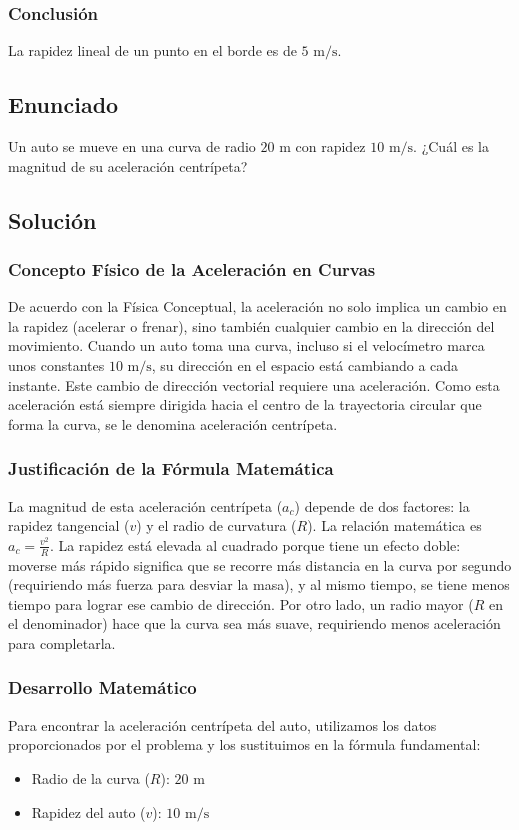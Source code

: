 \documentclass{article}
\begin{document}
\subsubsection*{Conclusión}
La rapidez lineal de un punto en el borde es de $5 \text{ m/s}$.

\newpage

\subsection*{Enunciado}
Un auto se mueve en una curva de radio $20 \text{ m}$ con rapidez $10 \text{ m/s}$. ¿Cuál es la magnitud de su aceleración centrípeta?

\subsection*{Solución}

\subsubsection*{Concepto Físico de la Aceleración en Curvas}
De acuerdo con la Física Conceptual, la aceleración no solo implica un cambio en la rapidez (acelerar o frenar), sino también cualquier cambio en la dirección del movimiento. Cuando un auto toma una curva, incluso si el velocímetro marca unos constantes $10 \text{ m/s}$, su dirección en el espacio está cambiando a cada instante. Este cambio de dirección vectorial requiere una aceleración. Como esta aceleración está siempre dirigida hacia el centro de la trayectoria circular que forma la curva, se le denomina aceleración centrípeta.

\subsubsection*{Justificación de la Fórmula Matemática}
La magnitud de esta aceleración centrípeta ($a_c$) depende de dos factores: la rapidez tangencial ($v$) y el radio de curvatura ($R$). La relación matemática es $a_c = \frac{v^2}{R}$. 
La rapidez está elevada al cuadrado porque tiene un efecto doble: moverse más rápido significa que se recorre más distancia en la curva por segundo (requiriendo más fuerza para desviar la masa), y al mismo tiempo, se tiene menos tiempo para lograr ese cambio de dirección. Por otro lado, un radio mayor ($R$ en el denominador) hace que la curva sea más suave, requiriendo menos aceleración para completarla.

\subsubsection*{Desarrollo Matemático}
Para encontrar la aceleración centrípeta del auto, utilizamos los datos proporcionados por el problema y los sustituimos en la fórmula fundamental:
\begin{itemize}
    \item Radio de la curva ($R$): $20 \text{ m}$
    \item Rapidez del auto ($v$): $10 \text{ m/s}$
\end{itemize}
\end{document}
